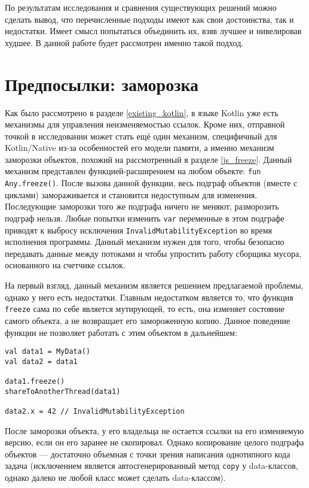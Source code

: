 \documentclass[specification,annotation,times]{itmo-student-thesis}
\begin{document}
По результатам исследования и сравнения существующих решений можно сделать вывод, что перечисленные подходы имеют как свои достоинства, так и недостатки.
Имеет смысл попытаться объединить их, взяв лучшее и нивелировав худшее. В данной работе будет рассмотрен именно такой подход.


\section{Предпосылки: заморозка}

Как было рассмотрено в разделе \ref{existing_kotlin}, в языке Kotlin уже есть механизмы для управления неизменяемостью ссылок.
Кроме них, отправной точкой в исследовании может стать ещё один механизм, специфичный для Kotlin/Native из-за особенностей его модели памяти, а именно механизм заморозки объектов, похожий на рассмотренный в разделе \ref{js_freeze}.
Данный механизм представлен функцией-расширением на любом объекте: \texttt{fun Any.freeze()}.
После вызова данной функции, весь подграф объектов (вместе с циклами) замораживается и становится недоступным для изменения. Последующие заморозки того же подграфа ничего не меняют, разморозить подграф нельзя.
Любые попытки изменить \texttt{var} переменные в этом подграфе приводят к выбросу исключения \texttt{InvalidMutabilityException} во время исполнения программы.
Данный механизм нужен для того, чтобы безопасно передавать данные между потоками и чтобы упростить работу сборщика мусора, основанного на счетчике ссылок.

На первый взгляд, данный механизм является решением предлагаемой проблемы, однако у него есть недостатки.
Главным недостатком является то, что функция \texttt{freeze} сама по себе является мутирующей, то есть, она изменяет состояние самого объекта, а не возвращает его замороженную копию.
Данное поведение функции не позволяет работать с этим объектом в дальнейшем:

\begin{lstlisting}[caption={Заморозка изначального объекта}]
val data1 = MyData()
val data2 = data1

data1.freeze()
shareToAnotherThread(data1)

data2.x = 42 // InvalidMutabilityException
\end{lstlisting}

После заморозки объекта, у его владельца не остается ссылки на его изменяемую версию, если он его заранее не скопировал.
Однако копирование целого подграфа объектов –-- достаточно объемная с точки зрения написания однотипного кода задача (исключением является автосгенерированный метод \texttt{copy} у data-классов, однако далеко не любой класс может сделать data-классом).
\end{document}
